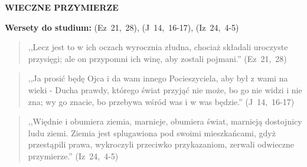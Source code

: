 \documentclass[10pt,a4paper,oneside]{article}
\begin{document}
\centerline{\textbf{\MakeUppercase{Wieczne przymierze}}}
\begin{center}
\textbf{Wersety do studium:} \mbox{(Ez 21, 28)}, \mbox{(J 14, 16-17)}, \mbox{(Iz 24, 4-5)}
\end{center}
\begin{quote}
,,Lecz jest to w ich oczach wyrocznia złudna, chociaż składali uroczyste przysięgi; ale on przypomni ich winę, aby zostali pojmani.'' \mbox{(Ez 21, 28)}
\end{quote}
\begin{quote}
,,Ja prosić będę Ojca i da wam innego Pocieszyciela, aby był z wami na wieki - Ducha prawdy, którego świat przyjąć nie może, bo go nie widzi i nie zna; wy go znacie, bo przebywa wśród was i w was będzie.'' \mbox{(J 14, 16-17)}
\end{quote}
\begin{quote}
,,Więdnie i obumiera ziemia, marnieje, obumiera świat, marnieją dostojnicy ludu ziemi. Ziemia jest splugawiona pod swoimi mieszkańcami, gdyż przestąpili prawa, wykroczyli przeciwko przykazaniom, zerwali odwieczne przymierze.'' \mbox{(Iz 24, 4-5)}
\end{quote}
\end{document}
